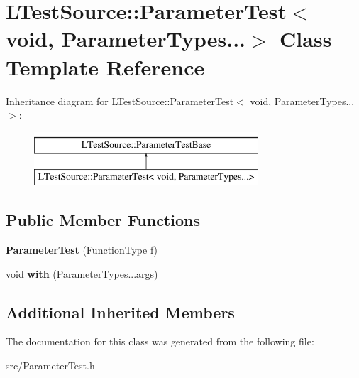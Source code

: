 \hypertarget{class_l_test_source_1_1_parameter_test_3_01void_00_01_parameter_types_8_8_8_4}{\section{L\-Test\-Source\-:\-:Parameter\-Test$<$ void, Parameter\-Types...$>$ Class Template Reference}
\label{class_l_test_source_1_1_parameter_test_3_01void_00_01_parameter_types_8_8_8_4}
}
Inheritance diagram for L\-Test\-Source\-:\-:Parameter\-Test$<$ void, Parameter\-Types...$>$\-:\begin{figure}[H]
\begin{center}
\leavevmode
\includegraphics[height=2.000000cm]{class_l_test_source_1_1_parameter_test_3_01void_00_01_parameter_types_8_8_8_4}
\end{center}
\end{figure}
\subsection*{Public Member Functions}
\begin{DoxyCompactItemize}
\item 
\hypertarget{class_l_test_source_1_1_parameter_test_3_01void_00_01_parameter_types_8_8_8_4_a414110480b1343a94f6fa1cc25949436}{{\bfseries Parameter\-Test} (Function\-Type f)}\label{class_l_test_source_1_1_parameter_test_3_01void_00_01_parameter_types_8_8_8_4_a414110480b1343a94f6fa1cc25949436}

\item 
\hypertarget{class_l_test_source_1_1_parameter_test_3_01void_00_01_parameter_types_8_8_8_4_a443fe696d4e73156dbb3df5aa38f5183}{void {\bfseries with} (Parameter\-Types...\-args)}\label{class_l_test_source_1_1_parameter_test_3_01void_00_01_parameter_types_8_8_8_4_a443fe696d4e73156dbb3df5aa38f5183}

\end{DoxyCompactItemize}
\subsection*{Additional Inherited Members}


The documentation for this class was generated from the following file\-:\begin{DoxyCompactItemize}
\item 
src/Parameter\-Test.\-h\end{DoxyCompactItemize}
